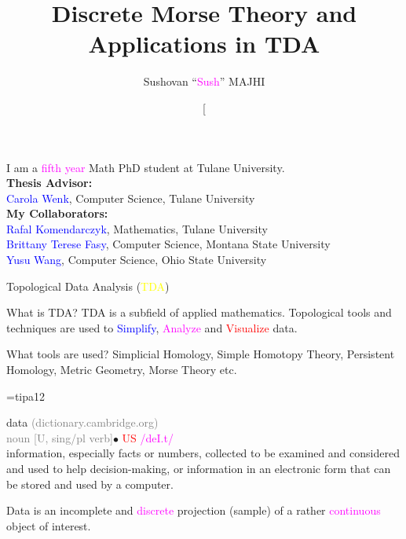 \documentclass[10pt,sans-serif]{beamer}
\title[TDA]{Discrete Morse Theory and Applications in TDA}
\author[Sush]{Sushovan ``\textcolor{magenta}{Sush}'' MAJHI} \date[Tulane
\begin{document}
\frame{\titlepage}


\begin{frame}{}
  I am a \textcolor{magenta}{fifth year} Math PhD student at Tulane University.
  \\
  \vspace{50pt}
  \textbf{Thesis Advisor:}\\
  \textcolor{blue}{Carola Wenk}, Computer Science, Tulane University\\

  \vspace{50pt} \textbf{My Collaborators:}\\ \textcolor{blue}{Rafal
    Komendarczyk}, Mathematics, Tulane University \\ \textcolor{blue}{Brittany
    Terese Fasy}, Computer Science, Montana State University
  \\ \textcolor{blue}{Yusu Wang}, Computer Science, Ohio State University
\end{frame}

\begin{frame}{Topological Data Analysis (\textcolor{yellow}{TDA})}
  \begin{block}{What is TDA?}
    TDA is a subfield of applied mathematics. Topological tools and techniques
    are used to \textcolor{blue}{Simplify}, \textcolor{magenta}{Analyze} and
    \textcolor{red}{Visualize} data.
  \end{block}

  \pause

  \begin{block}{What tools are used?}
    Simplicial Homology, Simple Homotopy Theory, Persistent Homology, Metric
    Geometry, Morse Theory etc.
  \end{block}
  
\end{frame}

\font\tenipa=tipa12
\def\schwa{{\tenipa\char64}}

\begin{frame}{}
  \begin{block}{}
    {\huge data } \textcolor{gray}{(dictionary.cambridge.org)}\\
    
    \textcolor{gray}{noun [U, sing/pl verb]}$\bullet$ \textcolor{red}{US}
    \textcolor{magenta}{/de\textrm{I}.t\schwa/} \\
    
    information, especially facts or numbers, collected to be examined and
    considered and used to help decision-making, or information in an electronic
    form that can be stored and used by a computer.
  \end{block}

  \pause
  
  \begin{block}{}
    Data is an incomplete and \textcolor{magenta}{discrete} projection (sample)
    of a rather \textcolor{magenta}{continuous} object of interest.
  \end{block}
\end{frame}
\end{document}
